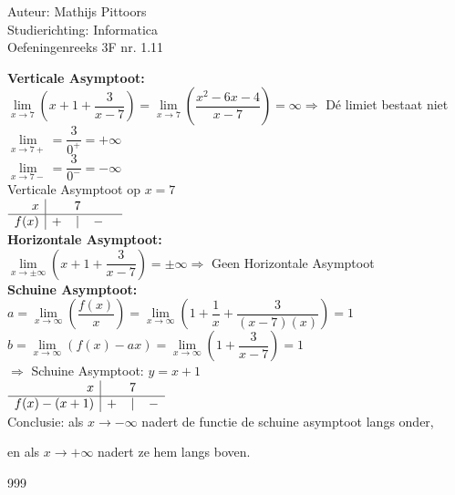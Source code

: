 \documentclass[a4paper]{article}
\newcommand{\llim}{\lim\limits}
\begin{document}
  
\noindent \large Auteur: Mathijs Pittoors \\
\noindent \large Studierichting: Informatica\\
\noindent \large Oefeningenreeks 3F nr. 1.11\\

\medskip

\normalsize

\textbf{Verticale Asymptoot:}\\

$ \llim_{x \rightarrow 7} \left( x + 1 + \dfrac{3}{x-7}\right) = \llim_{x \rightarrow 7} \left( \dfrac{x^2-6x-4}{x-7} \right) = \infty \Rightarrow $ Dé limiet bestaat niet\\

$\llim_{x \rightarrow 7+} = \dfrac{3}{0^+} = +\infty$\\

$\llim_{x \rightarrow 7-} = \dfrac{3}{0^-} = -\infty$\\

Verticale Asymptoot op $x=7$\\

$\begin{array}{r|c c c c}
x & & 7 & &\\ \hline
f(x) & + & | & - &
\end{array}$ \\



\textbf{Horizontale Asymptoot:}\\

$ \llim_{x \rightarrow \pm \infty}\left( x + 1 + \dfrac{3}{x-7}\right) = \pm \infty \Rightarrow $ Geen Horizontale Asymptoot\\

\textbf{Schuine Asymptoot:}\\

$a = \llim_{x \rightarrow \infty}\left(\dfrac{f(x)}{x}\right) = \llim_{x \rightarrow \infty}\left(1+\dfrac{1}{x}+\dfrac{3}{(x-7)(x)}\right) = 1 $\\

$b = \llim_{x \rightarrow \infty}(f(x)-ax) = \llim_{x \rightarrow \infty}\left(1+\dfrac{3}{x-7}\right) = 1$\\

$\Rightarrow$ Schuine Asymptoot: $y=x+1$\\

$\begin{array}{r|c c c}
x & & 7 & \\ \hline
f(x) - (x+1) & + & | & - 
\end{array}$ \\

Conclusie: als $x \rightarrow -\infty$ nadert de functie de schuine asymptoot langs onder, 

en als $x \rightarrow +\infty$ nadert ze hem langs boven.


\begin{thebibliography}{999}
\end{thebibliography}
\end{document}
